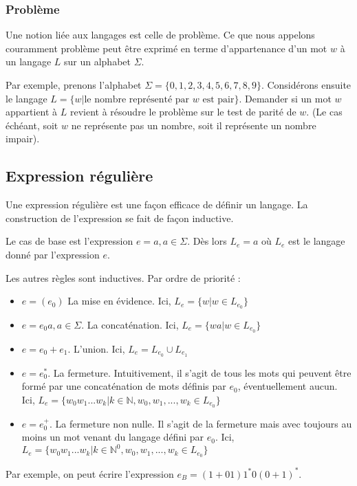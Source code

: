 	\subsubsection{Problème}
	Une notion liée aux langages est celle de problème. Ce que nous appelons couramment problème peut être exprimé en terme d'appartenance d'un mot $w$ à un langage $L$ sur un alphabet $\Sigma$.
	
	Par exemple, prenons l'alphabet $\Sigma=\{0,1,2,3,4,5,6,7,8,9\}$. Considérons ensuite le langage $L = \{w | \text{le nombre représenté par } w \text{ est pair}\}$.
	Demander si un mot $w$ appartient à $L$ revient à résoudre le problème sur le test de parité de $w$. (Le cas échéant, soit $w$ ne représente pas un nombre, soit il représente un nombre impair).
		
	\subsection{Expression régulière}
	
	Une expression régulière est une façon efficace de définir un langage. La construction de l'expression se fait de façon inductive.
	
	Le cas de base est l'expression $e = a, a \in \Sigma$. Dès lors $L_e = {a}$ où $L_e$ est le langage donné par l'expression $e$.
	
	Les autres règles sont inductives. Par ordre de priorité :
	\begin{itemize}
		\item $e = (e_0)$ La mise en évidence. Ici, $L_e = \{w|w \in L_{e_0}\}$
		\item $e = e_0a, a \in \Sigma$. La concaténation. Ici, $L_e = \{wa|w \in L_{e_0}\}$
		\item $e = e_0+e_1$. L'union. Ici, $L_e = L_{e_0} \cup L_{e_1}$
		\item $e = e_0^*$. La fermeture. Intuitivement, il s'agit de tous les mots qui peuvent être formé par une concaténation de mots définis par $e_0$, éventuellement aucun. Ici, $L_e = \{w_0w_1...w_k | k \in \mathbb{N}, w_0,w_1,...,w_k \in L_{e_0}\}$
		\item $e = e_0^+$. La fermeture non nulle. Il s'agit de la fermeture mais avec toujours au moins un mot venant du langage défini par $e_0$. Ici, $L_e = \{w_0w_1...w_k | k \in \mathbb{N}^0, w_0,w_1,...,w_k \in L_{e_0}\}$
	\end{itemize}
	
	Par exemple, on peut écrire l'expression $e_B = (1+01)1^*0(0+1)^*$.\\
	
